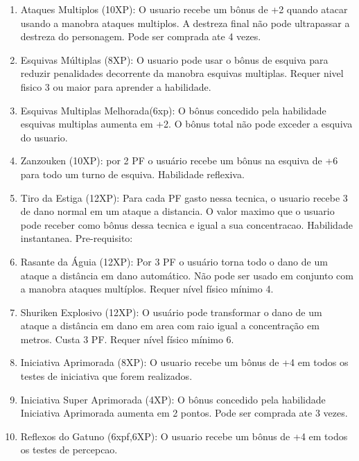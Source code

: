 \begin{enumerate}
	\item Ataques Multiplos (10XP): O usuario recebe um bônus de +2 quando atacar usando a manobra ataques multiplos. A destreza final não pode ultrapassar a destreza do personagem. Pode ser comprada ate 4 vezes. 
	
	\item Esquivas Múltiplas (8XP): O usuario pode usar o bônus de esquiva para reduzir penalidades decorrente da manobra esquivas multiplas. Requer nivel fisico 3 ou maior para aprender a habilidade.	

	\item Esquivas Multiplas Melhorada(6xp): O bônus concedido pela habilidade esquivas multiplas aumenta em +2. O bônus total não pode exceder a esquiva do usuario.
	
	\item Zanzouken (10XP): por 2 PF o usuário recebe um bônus na esquiva de +6 para todo um turno de esquiva. Habilidade reflexiva.

	\item Tiro da Estiga (12XP): Para cada PF gasto nessa tecnica, o usuario recebe 3 de dano normal em um ataque a distancia. O valor maximo que o usuario pode receber como bônus dessa tecnica e igual a sua concentracao. Habilidade instantanea. Pre-requisito: 

	\item Rasante da Águia (12XP): Por 3 PF o usuário torna todo o dano de um ataque a distância em dano automático. Não pode ser usado em conjunto com a manobra ataques multíplos. Requer nível físico mínimo 4.
	
	\item Shuriken Explosivo (12XP): O usuário pode transformar o dano de um ataque a distância em dano em area com raio igual a concentração em metros. Custa 3 PF. Requer nível físico mínimo 6.	

	\item Iniciativa Aprimorada (8XP): O usuario recebe um bônus de +4 em todos os testes de iniciativa que forem realizados.

	\item Iniciativa Super Aprimorada (4XP): O bônus concedido pela habilidade Iniciativa Aprimorada aumenta em 2 pontos. Pode ser comprada ate 3 vezes.

	\item Reflexos do Gatuno (6xpf,6XP): O usuario recebe um bônus de +4 em todos os testes de percepcao.


\end{enumerate}
